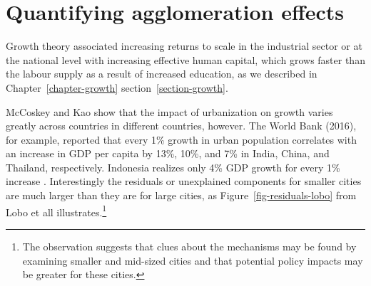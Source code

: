 





\section{Quantifying agglomeration effects}
Growth theory associated increasing returns to scale in the industrial sector or at the national level with increasing effective human capital, which grows faster than the labour supply as a result of increased education, as we described in Chapter~\ref{chapter-growth} section~\ref{section-growth}. %
 

McCoskey and Kao \cite{mccoskeyPanelDataInvestigation} show that the impact of urbanization on growth varies greatly across countries in different countries, however. The World Bank (2016), for example, reported that every 1\% growth in urban population correlates with an increase in GDP per capita by 13\%, 10\%, and 7\% in India, China, and Thailand, respectively. Indonesia realizes only 4\% GDP growth for every 1\% increase \cite{haryantotriRelationshipUrbanizationEducation2021}. Interestingly the residuals or unexplained components for smaller cities are much larger than they are for large cities, as Figure~\ref{fig-residuals-lobo} from Lobo et all \cite{loboUrbanScalingProduction2013} illustrates.\footnote{The observation suggests that clues about the mechanisms may be found by examining smaller and mid-sized cities and that potential policy impacts may be greater for these cities.}

